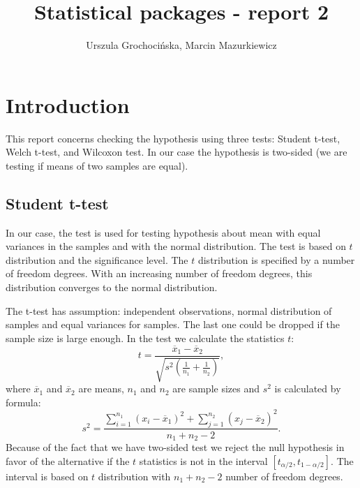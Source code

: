 \documentclass{article}
\begin{document}
  
  


\title{Statistical packages - report 2}
\author{Urszula Grochocińska, Marcin Mazurkiewicz}
\maketitle
\tableofcontents 


  \section{Introduction}
This report concerns checking the hypothesis using three tests: Student t-test, Welch t-test, and Wilcoxon test. In our case the hypothesis is two-sided (we are testing if means of two samples are equal).
  \subsection{Student t-test}
In our case, the test is used for testing hypothesis about mean with equal variances in the samples and with the normal distribution. The test is based on $t$ distribution and the significance level. The $t$ distribution is specified by a number of freedom degrees. With an increasing number of freedom degrees, this distribution converges to the normal distribution.

  The t-test has assumption: independent observations, normal distribution of samples and equal variances for samples. The last one could be dropped if the sample size is large enough.
  In the test we calculate the statistics $t$:
  \begin{equation}
  t=\frac{\overline{x}_1-\overline{x}_2}{\sqrt{s^2\left(\frac{1}{n_1}+\frac{1}{n_2}\right)}},
  \end{equation}
where $\overline{x}_1$ and $\overline{x}_2$ are means, $n_1$ and $n_2$ are sample sizes and $s^2$ is calculated by formula:
  \begin{equation}
    s^2=\frac{\sum_{i=1}^{n_1}(x_i-\overline{x}_1)^2+\sum_{j=1}^{n_2}(x_j-\overline{x}_2)^2}{n_1+n_2-2}.
  \end{equation}
Because of the fact that we have two-sided test we reject the null hypothesis in favor of the alternative if the $t$ statistics is not in the interval $[t_{\alpha/2}, t_{1-\alpha/2}]$. The interval is based on $t$ distribution with $n_1+n_2-2$ number of freedom degrees.
\end{document}
